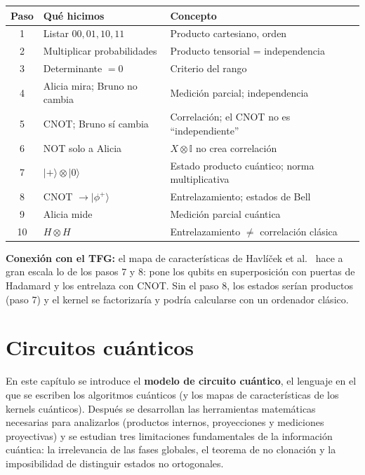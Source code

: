 \documentclass[11pt, a4paper, twoside, openright]{report}
\begin{document}
\begin{center}
\small\renewcommand{\arraystretch}{1.15}
\begin{tabular}{c|l|l}
\textbf{Paso} & \textbf{Qué hicimos} & \textbf{Concepto} \\ \hline
1 & Listar $00, 01, 10, 11$ & Producto cartesiano, orden \\
2 & Multiplicar probabilidades & Producto tensorial = independencia \\
3 & Determinante $= 0$ & Criterio del rango \\
4 & Alicia mira; Bruno no cambia & Medición parcial; independencia \\
5 & CNOT; Bruno sí cambia & Correlación; el CNOT no es ``independiente'' \\
6 & NOT solo a Alicia & $X\otimes\mathbb{I}$ no crea correlación \\
7 & $|+\rangle\otimes|0\rangle$ & Estado producto cuántico; norma multiplicativa \\
8 & CNOT $\to|\phi^+\rangle$ & Entrelazamiento; estados de Bell \\
9 & Alicia mide & Medición parcial cuántica \\
10 & $H\otimes H$ & Entrelazamiento $\neq$ correlación clásica
\end{tabular}
\end{center}

\noindent \textbf{Conexión con el TFG:} el mapa de características de Havlíček et al.\ \cite{havlicek2019supervised} hace a gran escala lo de los pasos 7 y 8: pone los qubits en superposición con puertas de Hadamard y los entrelaza con CNOT. Sin el paso 8, los estados serían productos (paso 7) y el kernel se factorizaría y podría calcularse con un ordenador clásico.


\chapter{Circuitos cuánticos}

\noindent En este capítulo se introduce el \textbf{modelo de circuito cuántico}, el lenguaje en el que se escriben los algoritmos cuánticos (y los mapas de características de los kernels cuánticos). Después se desarrollan las herramientas matemáticas necesarias para analizarlos (productos internos, proyecciones y mediciones proyectivas) y se estudian tres limitaciones fundamentales de la información cuántica: la irrelevancia de las fases globales, el teorema de no clonación y la imposibilidad de distinguir estados no ortogonales.
\cleardoublepage
\end{document}
